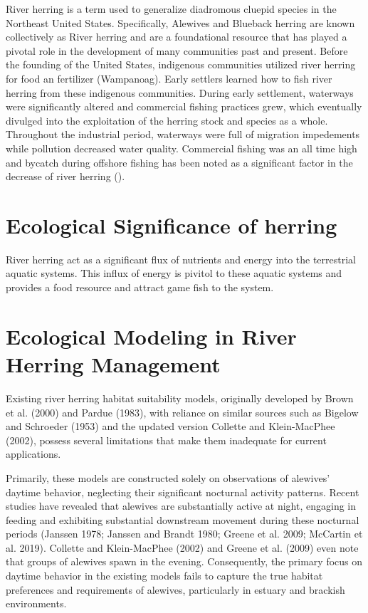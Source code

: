 \documentclass[
]{book}
\begin{document}
River herring is a term used to generalize diadromous cluepid species in the Northeast United States. Specifically, Alewives and Blueback herring are known collectively as River herring and are a foundational resource that has played a pivotal role in the development of many communities past and present. Before the founding of the United States, indigenous communities utilized river herring for food an fertilizer (Wampanoag). Early settlers learned how to fish river herring from these indigenous communities. During early settlement, waterways were significantly altered and commercial fishing practices grew, which eventually divulged into the exploitation of the herring stock and species as a whole. Throughout the industrial period, waterways were full of migration impedements while pollution decreased water quality. Commercial fishing was an all time high and bycatch during offshore fishing has been noted as a significant factor in the decrease of river herring ().

\hypertarget{ecological-significance-of-herring}{%
\section{Ecological Significance of herring}\label{ecological-significance-of-herring}}

River herring act as a significant flux of nutrients and energy into the terrestrial aquatic systems. This influx of energy is pivitol to these aquatic systems and provides a food resource and attract game fish to the system.

\hypertarget{ecological-modeling-in-river-herring-management}{%
\section{Ecological Modeling in River Herring Management}\label{ecological-modeling-in-river-herring-management}}

Existing river herring habitat suitability models, originally developed by Brown et al. (2000) and Pardue (1983), with reliance on similar sources such as Bigelow and Schroeder (1953) and the updated version Collette and Klein-MacPhee (2002), possess several limitations that make them inadequate for current applications.

Primarily, these models are constructed solely on observations of alewives' daytime behavior, neglecting their significant nocturnal activity patterns.
Recent studies have revealed that alewives are substantially active at night, engaging in feeding and exhibiting substantial downstream movement during these nocturnal periods (Janssen 1978; Janssen and Brandt 1980; Greene et al. 2009; McCartin et al. 2019).
Collette and Klein-MacPhee (2002) and Greene et al. (2009) even note that groups of alewives spawn in the evening. Consequently, the primary focus on daytime behavior in the existing models fails to capture the true habitat preferences and requirements of alewives, particularly in estuary and brackish environments.
\end{document}
